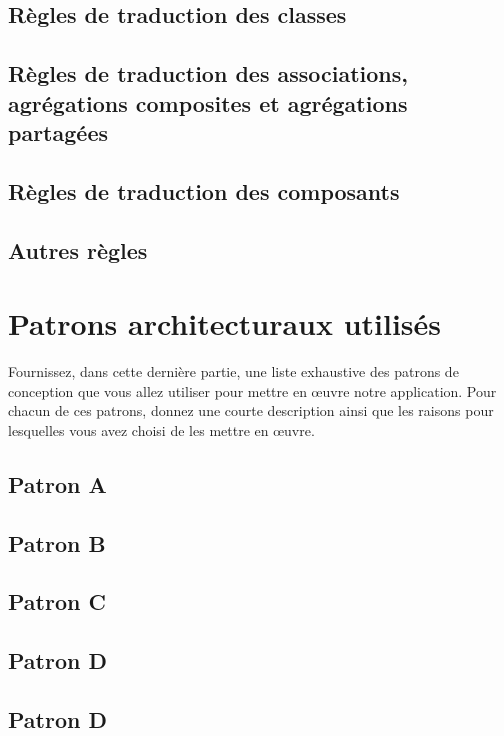 \subsection{Règles de traduction des classes}

\subsection{Règles de traduction des associations, agrégations composites et agrégations partagées}

\subsection{Règles de traduction des composants}

\subsection{Autres règles}



\section{Patrons architecturaux utilisés}

Fournissez, dans cette dernière partie, une liste exhaustive des patrons de conception que vous allez utiliser pour mettre en œuvre notre application. 
Pour chacun de ces patrons, donnez une courte description ainsi que les raisons pour lesquelles vous avez choisi de les mettre en \oe uvre.\\


\subsection{Patron A}

\subsection{Patron B}

\subsection{Patron C}

\subsection{Patron D}

\subsection{Patron D}

